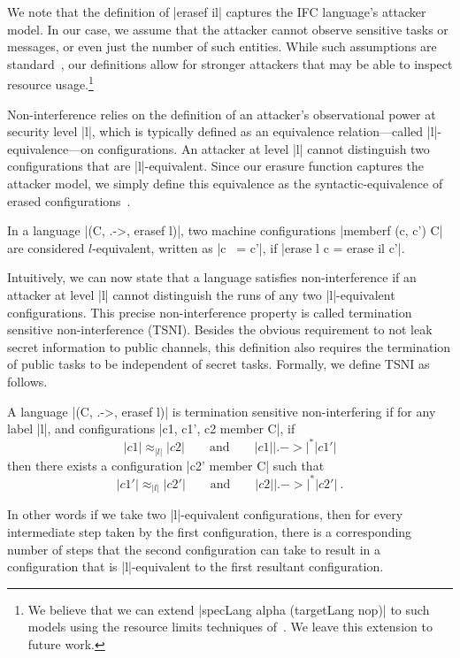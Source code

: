 We note that the definition of |erasef il| captures the IFC
language's attacker model. 
%
In our case, we assume that the attacker cannot observe sensitive tasks or
messages, or even just the number of such entities.
%
While such assumptions are standard~\tocite{}, our definitions allow for
stronger attackers that may be able to inspect resource usage.\footnote{
  We believe that we can extend |specLang alpha (targetLang nop)| to
  such models using the resource limits techniques of~\tocite{}.
  We leave this extension to future work.
}

Non-interference relies on the definition of an attacker's observational power at
security level |l|, which is typically defined as an equivalence
relation---called |l|-equivalence---on configurations.  An attacker
at level |l| cannot
distinguish two configurations that are |l|-equivalent.
%
Since our erasure function captures the attacker model, we simply define this
equivalence as the syntactic-equivalence of erased configurations~\cite{stefan:addressing-covert}.
%
\begin{definition}[|l|-equivalence]
    In a language |(C, .->, erasef l)|, two machine configurations
    |memberf (c, c') C| are considered $l$-equivalent, written as |c ~= c'|,
    if |erase l c = erase il c'|.
\end{definition}
%

Intuitively, we can now state that a language satisfies non-interference if an
attacker at level |l| cannot distinguish the runs of any two |l|-equivalent
configurations.
%
This precise non-interference property is called termination sensitive non-interference
(TSNI).  Besides the obvious requirement to not leak secret information
to public channels, this definition also requires the termination
of public tasks to be independent of secret tasks.
%
Formally, we define TSNI as follows.

\begin{definition}
  A language |(C, .->, erasef l)| is termination
  sensitive non-interfering if for any label |l|, and configurations
  |c1, c1', c2 member C|, if
  \begin{equation} \label{eq:tsni-lhs}
    |c1| \approx_{|l|} |c2|
    \qquad \text{and} \qquad
    |c1| |.->|^* |c1'|
  \end{equation}
  then there exists a configuration |c2' member C| such that
  \begin{equation} \label{eq:tsni-rhs}
    |c1'| \approx_{|l|} |c2'|
     \qquad \text{and} \qquad
    |c2| |.->|^* |c2'|
    \ \text{.}
  \end{equation}
\end{definition}
%
In other words if we take two |l|-equivalent configurations, then for every
intermediate step taken by the first configuration, there is a corresponding
number of steps that the second configuration can take to result in a
configuration that is |l|-equivalent to the first resultant configuration.


